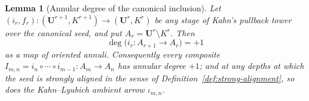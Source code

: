 \documentclass[11pt,reqno]{amsart}
\newtheorem{lemma}[theorem]{Lemma}
\theoremstyle{definition}
\theoremstyle{remark}
\begin{document}
\begin{lemma}[Annular degree of the canonical inclusion]
\label{lem:annular-degree}
Let \((i_r,f_r)\colon(\mathbf U^{r+1},K^{r+1})\to(\mathbf U^r,K^r)\) be any stage of Kahn's pullback tower over the canonical seed, and put \(A_r=\mathbf U^r\setminus K^r\).  Then
\[
 \deg\bigl(i_r\colon A_{r+1}\to A_r\bigr)=+1
\]
as a map of oriented annuli.  Consequently every composite \(I_{m,n}=i_n\circ\cdots\circ i_{m-1}\colon A_m\to A_n\) has annular degree \(+1\); and at any depths at which the seed is strongly aligned in the sense of Definition~\ref{def:strong-alignment}, so does the Kahn--Lyubich ambient arrow \(\iota_{m,n}\).
\end{lemma}
\end{document}

